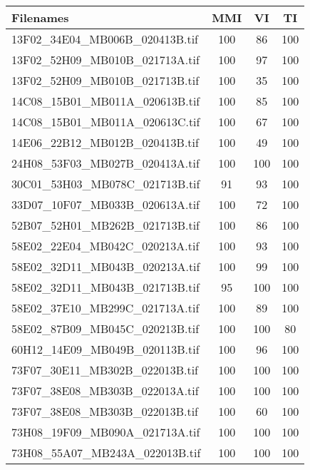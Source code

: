 \begin{tabular}{lccc}
\hline
 Filenames                                & MMI & VI  & TI  \\ \hline \hline
 13F02\_34E04\_MB006B\_020413B.tif & 100 & 86  & 100 \\
 13F02\_52H09\_MB010B\_021713A.tif & 100 & 97  & 100 \\
 13F02\_52H09\_MB010B\_021713B.tif & 100 & 35  & 100 \\
 14C08\_15B01\_MB011A\_020613B.tif & 100 & 85  & 100 \\
 14C08\_15B01\_MB011A\_020613C.tif & 100 & 67  & 100 \\
 14E06\_22B12\_MB012B\_020413B.tif & 100 & 49  & 100 \\
 24H08\_53F03\_MB027B\_020413A.tif & 100 & 100 & 100 \\
 30C01\_53H03\_MB078C\_021713B.tif & 91  & 93  & 100 \\
 33D07\_10F07\_MB033B\_020613A.tif & 100 & 72  & 100 \\
 52B07\_52H01\_MB262B\_021713B.tif & 100 & 86  & 100 \\
 58E02\_22E04\_MB042C\_020213A.tif & 100 & 93  & 100 \\
 58E02\_32D11\_MB043B\_020213A.tif & 100 & 99  & 100 \\
 58E02\_32D11\_MB043B\_021713B.tif & 95  & 100 & 100 \\
 58E02\_37E10\_MB299C\_021713A.tif & 100 & 89  & 100 \\
 58E02\_87B09\_MB045C\_020213B.tif & 100 & 100 & 80  \\
 60H12\_14E09\_MB049B\_020113B.tif & 100 & 96  & 100 \\
 73F07\_30E11\_MB302B\_022013B.tif & 100 & 100 & 100 \\
 73F07\_38E08\_MB303B\_022013A.tif & 100 & 100 & 100 \\
 73F07\_38E08\_MB303B\_022013B.tif & 100 & 60  & 100 \\
 73H08\_19F09\_MB090A\_021713A.tif & 100 & 100 & 100 \\
 73H08\_55A07\_MB243A\_022013B.tif & 100 & 100 & 100 \\
\hline
\end{tabular}